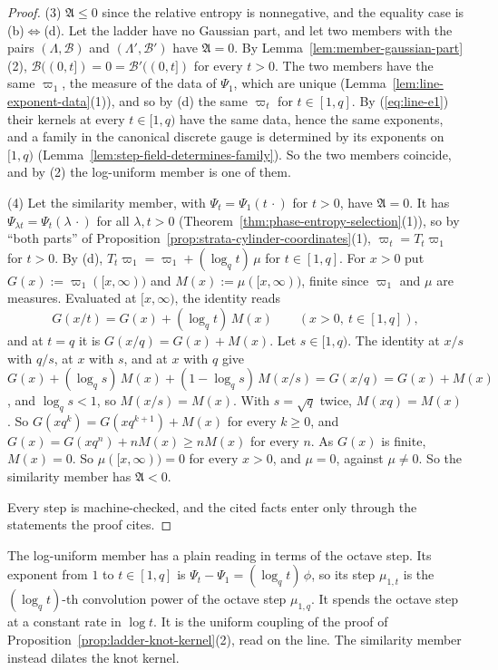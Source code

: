\begin{proof}
(3) $\mathfrak{A} \le 0$ since the relative entropy is nonnegative, and the equality case is
(b)$\Leftrightarrow$(d). Let the ladder have no Gaussian part, and let two members with the pairs
$(\Lambda, \mathcal{B})$ and $(\Lambda', \mathcal{B}')$ have $\mathfrak{A} = 0$. By
Lemma~\ref{lem:member-gaussian-part}(2), $\mathcal{B}((0,t]) = 0 = \mathcal{B}'((0,t])$ for every
$t > 0$. The two members have the same $\varpi_1$, the measure of the data of $\Psi_1$, which are
unique (Lemma~\ref{lem:line-exponent-data}(1)), and so by (d) the same $\varpi_t$ for
$t \in [1,q]$. By (\ref{eq:line-e1}) their kernels at every $t \in [1,q)$ have the same data, hence the same
exponents, and a family in the canonical discrete gauge is determined by its exponents on $[1,q)$
(Lemma~\ref{lem:step-field-determines-family}). So the two members coincide, and by (2) the
log-uniform member is one of them.

(4) Let the similarity member, with $\Psi_t = \Psi_1(t\,\cdot)$ for $t > 0$, have
$\mathfrak{A} = 0$. It has $\Psi_{\lambda t} = \Psi_t(\lambda\,\cdot)$ for all $\lambda, t > 0$
(Theorem~\ref{thm:phase-entropy-selection}(1)), so by ``both parts'' of
Proposition~\ref{prop:strata-cylinder-coordinates}(1), $\varpi_t = T_t\varpi_1$ for $t > 0$. By (d),
$T_t\varpi_1 = \varpi_1 + (\log_qt)\,\mu$ for $t \in [1,q]$. For $x > 0$ put
$G(x) := \varpi_1([x,\infty))$ and $M(x) := \mu([x,\infty))$, finite since $\varpi_1$ and $\mu$ are
\Levy{} measures. Evaluated at $[x,\infty)$, the identity reads
\[
  G(x/t) = G(x) + (\log_qt)\,M(x) \qquad (x > 0,\ t \in [1,q]),
\]
and at $t = q$ it is $G(x/q) = G(x) + M(x)$. Let $s \in [1,q)$. The identity at $x/s$ with $q/s$, at
$x$ with $s$, and at $x$ with $q$ give
$G(x) + (\log_qs)\,M(x) + (1 - \log_qs)\,M(x/s) = G(x/q) = G(x) + M(x)$, and $\log_qs < 1$, so
$M(x/s) = M(x)$. With $s = \sqrt q$ twice, $M(xq) = M(x)$. So
$G(xq^k) = G(xq^{k+1}) + M(x)$ for every $k \ge 0$, and $G(x) = G(xq^n) + nM(x) \ge nM(x)$ for every
$n$. As $G(x)$ is finite, $M(x) = 0$. So $\mu([x,\infty)) = 0$ for every $x > 0$, and $\mu = 0$,
against $\mu \ne 0$. So the similarity member has $\mathfrak{A} < 0$.

Every step is machine-checked, and the cited facts enter only through the statements the proof
cites.
\end{proof}

The log-uniform member has a plain reading in terms of the octave step. Its exponent from $1$ to
$t \in [1,q]$ is $\Psi_t - \Psi_1 = (\log_qt)\,\phi$, so its step $\mu_{1,t}$ is the
$(\log_qt)$-th convolution power of the octave step $\mu_{1,q}$. It spends the octave step at a
constant rate in $\log t$. It is the uniform coupling of the proof of
Proposition~\ref{prop:ladder-knot-kernel}(2), read on the line. The similarity member instead
dilates the knot kernel.


